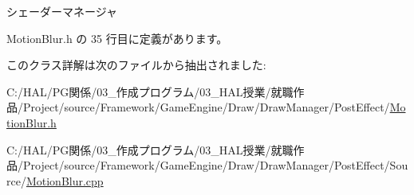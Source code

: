 シェーダーマネージャ 



 Motion\+Blur.\+h の 35 行目に定義があります。



このクラス詳解は次のファイルから抽出されました\+:\begin{DoxyCompactItemize}
\item 
C\+:/\+H\+A\+L/\+P\+G関係/03\+\_\+作成プログラム/03\+\_\+\+H\+A\+L授業/就職作品/\+Project/source/\+Framework/\+Game\+Engine/\+Draw/\+Draw\+Manager/\+Post\+Effect/\mbox{\hyperlink{_motion_blur_8h}{Motion\+Blur.\+h}}\item 
C\+:/\+H\+A\+L/\+P\+G関係/03\+\_\+作成プログラム/03\+\_\+\+H\+A\+L授業/就職作品/\+Project/source/\+Framework/\+Game\+Engine/\+Draw/\+Draw\+Manager/\+Post\+Effect/\+Source/\mbox{\hyperlink{_motion_blur_8cpp}{Motion\+Blur.\+cpp}}\end{DoxyCompactItemize}
